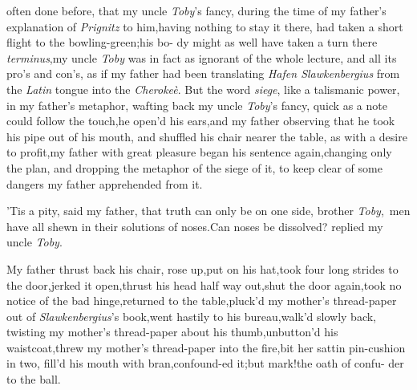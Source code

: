 \documentclass{article}
\begin{document}
\noindent
{} often
done before, that my uncle \textit{Toby}’s fancy, during the
time of my father’s explanation of \textit{Prignitz} to
him,\tsh having nothing to stay it there, had taken a short
flight to the bowling-green;\tsh his bo-\break
dy might as well have taken a turn there
\textit{terminus},\tsh my uncle \textit{Toby} was in fact\break
as ignorant
of the whole lecture, and all its pro’s and con’s, as if my
father had been translating \textit{Hafen Slawkenbergius}\break
from the \textit{Latin} tongue into the \textit{Cherokeè}.
But the word \textit{siege}, like a talismanic\break
power, in my
father’s metaphor, wafting back my uncle \textit{Toby}’s
fancy, quick as a note could follow the touch,\tsk he open’d
his ears,\tsk and my father observing that he took his pipe
out of his mouth, and shuffled his chair nearer the table,
as with a desire to profit,\tsk my father with great
pleasure began his sentence again,\tsh changing only the
plan, and dropping the metaphor of the siege of it, to keep
clear of some dangers my father apprehended from it.

\smallskip
{}

\newpage
’Tis a pity, said my father, that truth can only be on one
side, brother \textit{Toby},\,\tsk\break
{}
men have all shewn in their solutions of
noses.\tsh Can noses be dissolved? repli\-ed my uncle
\textit{Toby}.\tsh

\tsh My father thrust back his chair,\break
\tsh rose up,\tsk put on his
hat,\tsk took four long strides to the
door,\tsk jerked it open,\tsk thrust his head half
way out,\tsk shut the door again,\tsk took no
notice of the bad hinge,\tsk returned to the
table,\tsk\break pluck’d my mother’s thread-paper out of
\textit{Slawkenbergius}’s book,\tsk went hastily to his
bureau,\tsk walk’d slowly back, twisting my mother’s
thread-paper about his thumb,\tsk unbutton’d his
waistcoat,\tsh threw my mother’s thread-paper into the
fire,\tsk bit her sattin pin-cushion in two, fill’d
his mouth with bran,\tsk confound-\break ed it;\tsk but mark!\tsk the
oath of confu-
der to the ball.
\end{document}
